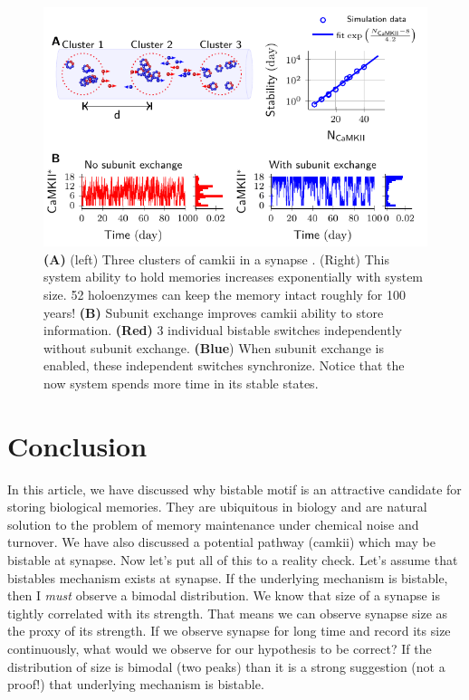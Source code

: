 \documentclass[]{resonance}
\begin{document}
\begin{figure}[]
    \caption{ \textbf{(A)} (left) Three clusters of \gls{camkii} in a synapse
        . (Right) This system ability to hold memories increases exponentially
        with system size. 52 holoenzymes can keep the memory intact roughly for
        100 years! \textbf{(B)} Subunit exchange improves \gls{camkii} ability
        to store information. \textbf{(Red)} 3 individual bistable switches independently  
        without subunit exchange. \textbf{(Blue}) When subunit exchange is enabled, these 
        independent switches synchronize. Notice that the now system spends more 
        time in its stable states.
    }\label{fig:camkii_sync}
    \includegraphics[width=\linewidth]{./bistable/Fig5/figure_sync_114mm.pdf}
\end{figure}


\section{Conclusion} In this article, we have discussed why bistable motif is an
attractive candidate for storing biological memories. They are ubiquitous in
biology and are natural solution to the problem of memory maintenance under
chemical noise and turnover.  We have also discussed a potential pathway
(\gls{camkii}) which may be bistable at synapse. Now let's put all of this to a
reality check. Let's assume that bistables mechanism exists at synapse. If the
underlying mechanism is bistable, then I \emph{must} observe a bimodal
distribution. We know that size of a synapse is tightly correlated with its
strength. That means we can observe synapse size as the proxy of its strength.
If we observe synapse for long time and record its size continuously, what would
we observe for our hypothesis to be correct?  If the distribution of size is
bimodal (two peaks) than it is a strong suggestion (not a proof!) that
underlying mechanism is bistable. 
\end{document}

